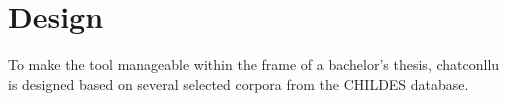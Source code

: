 \chapter{Design} %

\label{Chapter3} %

To make the tool manageable within the frame of a bachelor's thesis, chatconllu is designed based on several selected corpora from the CHILDES database.

